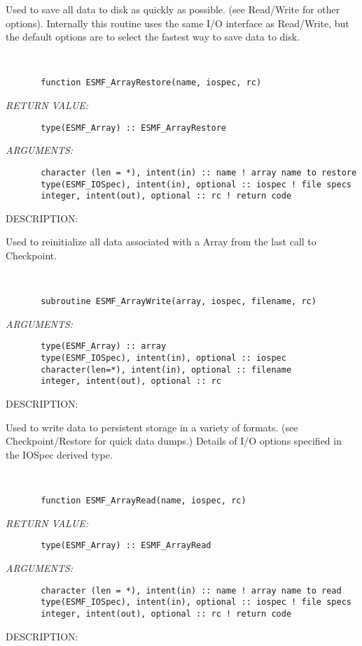    Used to save all data to disk as quickly as possible.
   (see Read/Write for other options). Internally this routine uses the
   same I/O interface as Read/Write, but the default options are to
   select the fastest way to save data to disk.
   
 
\mbox{}\hrulefill\ 
 

\begin{verbatim}       function ESMF_ArrayRestore(name, iospec, rc)\end{verbatim}{\em RETURN VALUE:}
\begin{verbatim}       type(ESMF_Array) :: ESMF_ArrayRestore\end{verbatim}{\em ARGUMENTS:}
\begin{verbatim}       character (len = *), intent(in) :: name ! array name to restore
       type(ESMF_IOSpec), intent(in), optional :: iospec ! file specs
       integer, intent(out), optional :: rc ! return code\end{verbatim}
{\sf DESCRIPTION:\\ }


   Used to reinitialize
   all data associated with a Array from the last call to Checkpoint.
   
 
\mbox{}\hrulefill\ 
 

\begin{verbatim}       subroutine ESMF_ArrayWrite(array, iospec, filename, rc)\end{verbatim}{\em ARGUMENTS:}
\begin{verbatim}       type(ESMF_Array) :: array
       type(ESMF_IOSpec), intent(in), optional :: iospec
       character(len=*), intent(in), optional :: filename
       integer, intent(out), optional :: rc\end{verbatim}
{\sf DESCRIPTION:\\ }


   Used to write data to persistent storage in a variety of formats.
   (see Checkpoint/Restore for quick data dumps.) Details of I/O
   options specified in the IOSpec derived type.
  
   
 
\mbox{}\hrulefill\ 
 

\begin{verbatim}       function ESMF_ArrayRead(name, iospec, rc)\end{verbatim}{\em RETURN VALUE:}
\begin{verbatim}       type(ESMF_Array) :: ESMF_ArrayRead\end{verbatim}{\em ARGUMENTS:}
\begin{verbatim}       character (len = *), intent(in) :: name ! array name to read
       type(ESMF_IOSpec), intent(in), optional :: iospec ! file specs
       integer, intent(out), optional :: rc ! return code\end{verbatim}
{\sf DESCRIPTION:\\ }


